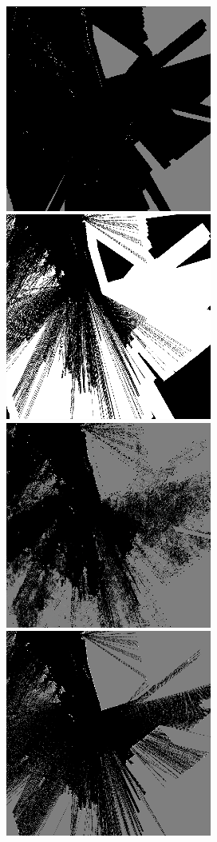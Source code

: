 \begin{figure}[h!]
  \\%
  \includegraphics[width=\frac\linewidth]{./files/media/fr_campus_100p_10cm/00009_input.png}%
  \includegraphics[width=\frac\linewidth]{./files/media/fr_campus_100p_10cm/00009_mask.png}%
  \includegraphics[width=\frac\linewidth]{./files/media/fr_campus_100p_10cm/00009_output.png}%
  \includegraphics[width=\frac\linewidth]{./files/media/fr_campus_100p_10cm/00009_estimated.png}%

\end{figure}
